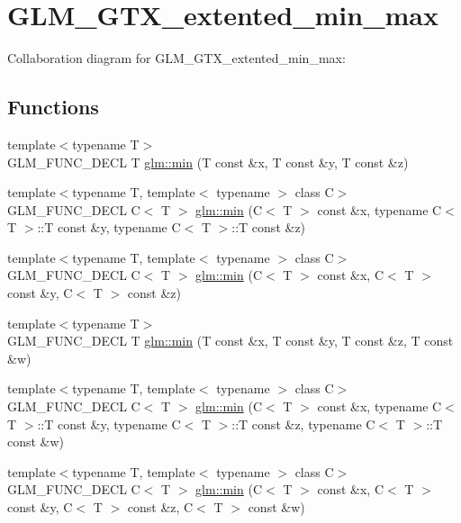 \hypertarget{group__gtx__extented__min__max}{
\section{GLM\_\-GTX\_\-extented\_\-min\_\-max}
\label{group__gtx__extented__min__max}
}


Collaboration diagram for GLM\_\-GTX\_\-extented\_\-min\_\-max:\subsection*{Functions}
\begin{CompactItemize}
\item 
{\footnotesize template$<$typename T$>$ }\\GLM\_\-FUNC\_\-DECL T \hyperlink{group__gtx__extented__min__max_gff0ad3009c15ec132717c7150dd96803}{glm::min} (T const \&x, T const \&y, T const \&z)
\item 
{\footnotesize template$<$typename T, template$<$ typename $>$ class C$>$ }\\GLM\_\-FUNC\_\-DECL C$<$ T $>$ \hyperlink{group__gtx__extented__min__max_gd88885e3f9bbaeab162e9ea22db68858}{glm::min} (C$<$ T $>$ const \&x, typename C$<$ T $>$::T const \&y, typename C$<$ T $>$::T const \&z)
\item 
{\footnotesize template$<$typename T, template$<$ typename $>$ class C$>$ }\\GLM\_\-FUNC\_\-DECL C$<$ T $>$ \hyperlink{group__gtx__extented__min__max_g50d031fb07c48e0626d12bf891df996d}{glm::min} (C$<$ T $>$ const \&x, C$<$ T $>$ const \&y, C$<$ T $>$ const \&z)
\item 
{\footnotesize template$<$typename T$>$ }\\GLM\_\-FUNC\_\-DECL T \hyperlink{group__gtx__extented__min__max_gdb4c9ecc8ca939f43ba21f8f13a2ad5b}{glm::min} (T const \&x, T const \&y, T const \&z, T const \&w)
\item 
{\footnotesize template$<$typename T, template$<$ typename $>$ class C$>$ }\\GLM\_\-FUNC\_\-DECL C$<$ T $>$ \hyperlink{group__gtx__extented__min__max_g8c81655ede8d78e3c7d8294cdef3f483}{glm::min} (C$<$ T $>$ const \&x, typename C$<$ T $>$::T const \&y, typename C$<$ T $>$::T const \&z, typename C$<$ T $>$::T const \&w)
\item 
{\footnotesize template$<$typename T, template$<$ typename $>$ class C$>$ }\\GLM\_\-FUNC\_\-DECL C$<$ T $>$ \hyperlink{group__gtx__extented__min__max_gca95a5fd4be0ad53f4474e69867bf974}{glm::min} (C$<$ T $>$ const \&x, C$<$ T $>$ const \&y, C$<$ T $>$ const \&z, C$<$ T $>$ const \&w)

\end{CompactItemize}
